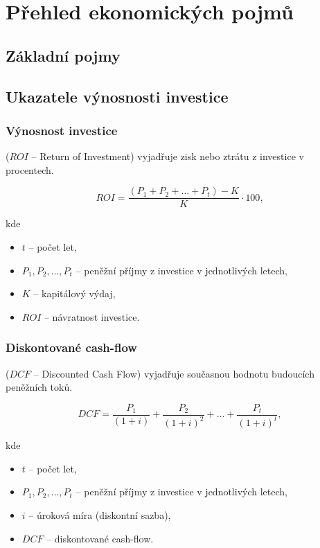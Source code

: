 \section{Přehled ekonomických pojmů}

\subsection{Základní pojmy}

\subsection{Ukazatele výnosnosti investice}


\subsubsection{Výnosnost investice}
($ROI$ -- Return of Investment)
vyjadřuje zisk nebo ztrátu z investice v procentech.

\begin{equation}
    ROI = \frac{(P_1 + P_2 + \ldots + P_t) - K}{K} \cdot 100,
\end{equation}

kde
\begin{itemize}[label={}]
    \item $t$ -- počet let,
    \item $P_1, P_2, \ldots, P_t$ -- peněžní příjmy z investice v jednotlivých letech,
    \item $K$ -- kapitálový výdaj,
    \item $ROI$ -- návratnost investice.
\end{itemize}

\subsubsection{Diskontované cash-flow}
($DCF$ -- Discounted Cash Flow)
vyjadřuje současnou hodnotu budoucích peněžních toků.

\begin{equation}
    DCF = \frac{P_1}{(1+i)} + \frac{P_2}{(1+i)^2} + \ldots + \frac{P_t}{(1+i)^t},
\end{equation}

kde
\begin{itemize}[label={}]
    \item $t$ -- počet let,
    \item $P_1, P_2, \ldots, P_t$ -- peněžní příjmy z investice v jednotlivých letech,
    \item $i$ -- úroková míra (diskontní sazba),
    \item $DCF$ -- diskontované cash-flow.
\end{itemize}

